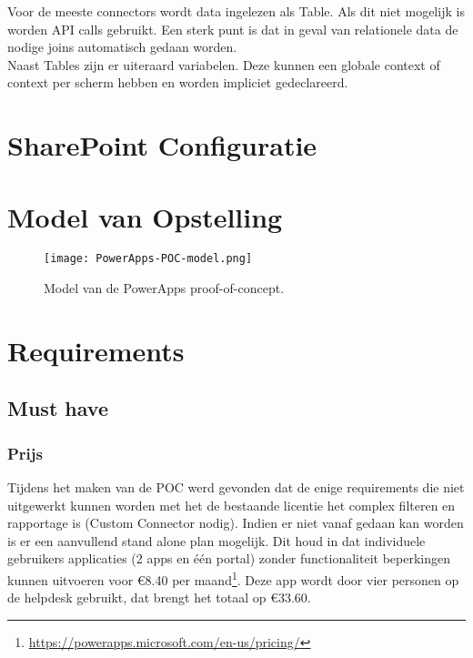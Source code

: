 Voor de meeste connectors wordt data ingelezen als Table. Als dit niet mogelijk is worden API calls gebruikt. Een sterk punt is dat in geval van relationele data de nodige joins automatisch gedaan worden. \autocite{Lindhorst2018}\\
Naast Tables zijn er uiteraard variabelen. Deze kunnen een globale context of context per scherm hebben en worden impliciet gedeclareerd.

\section{SharePoint Configuratie}
\label{sec:sharepoint}


\section{Model van Opstelling}

\begin{figure}[h!]
    \centering
    \texttt{[image: PowerApps-POC-model.png]}
    \caption{Model van de PowerApps proof-of-concept.}
    \label{fig:PowerApps-POC-model}
\end{figure}

\section{Requirements}

\subsection{Must have}

\subsubsection{Prijs}

Tijdens het maken van de POC werd gevonden dat de enige requirements die niet uitgewerkt kunnen worden met het de bestaande licentie het complex filteren en rapportage is (Custom Connector nodig). Indien er niet vanaf gedaan kan worden is er een aanvullend stand alone plan mogelijk. Dit houd in dat individuele gebruikers applicaties (2 apps en één portal) zonder functionaliteit beperkingen kunnen uitvoeren voor \euro 8.40 per maand\footnote{\url{https://powerapps.microsoft.com/en-us/pricing/}}. Deze app wordt door vier personen op de helpdesk gebruikt, dat brengt het totaal op \euro 33.60.

